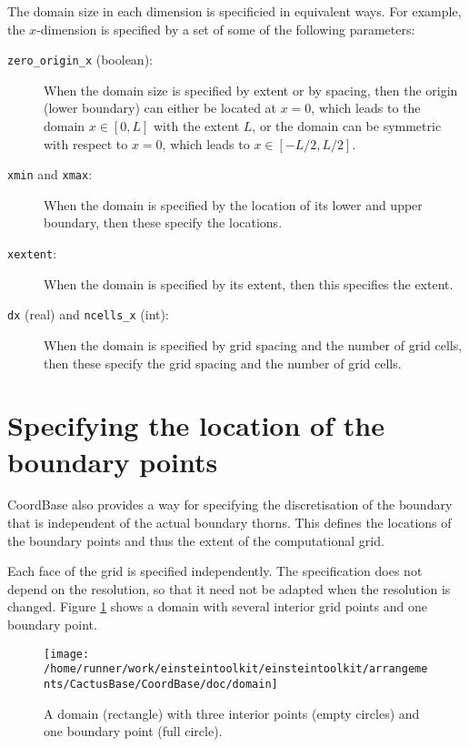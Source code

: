 The domain size in each dimension is specificied in equivalent ways.
For example, the $x$-dimension is specified by a set of some of the
following parameters:
\begin{description}
\item[{\texttt{zero\_origin\_x}} (boolean):]
When the domain size is specified by extent or by spacing, then the
origin (lower boundary) can either be located at $x=0$, which leads to
the domain $x \in [0,L]$ with the extent $L$, or the domain can be
symmetric with respect to $x=0$, which leads to $x \in [-L/2,L/2]$.
\item[{\texttt{xmin}} and {\texttt{xmax}}:]
When the domain is specified by the location of its lower and upper
boundary, then these specify the locations.
\item[{\texttt{xextent}}:]
When the domain is specified by its extent, then this specifies the
extent.
\item[{\texttt{dx}} (real) and {\texttt{ncells\_x}} (int):]
When the domain is specified by grid spacing and the number of grid
cells, then these specify the grid spacing and the number of grid
cells.
\end{description}


\section{Specifying the location of the boundary points}
\label{CactusBase:CoordBase:boundary}

CoordBase also provides a way for specifying the discretisation of the
boundary that is independent of the actual boundary thorns.  This
defines the locations of the boundary points and thus the extent of
the computational grid.

Each face of the grid is specified independently.  The specification
does not depend on the resolution, so that it need not be adapted when
the resolution is changed.  Figure
{\ref{CactusBase:CoordBase:fig-domain}} shows a domain with several
interior grid points and one boundary point.

\begin{figure}
\begin{center}
\texttt{[image: /home/runner/work/einsteintoolkit/einsteintoolkit/arrangements/CactusBase/CoordBase/doc/domain]}
\end{center}
\caption{A domain (rectangle) with three interior points (empty
circles) and one boundary point (full circle).}
\label{CactusBase:CoordBase:fig-domain}
\end{figure}

